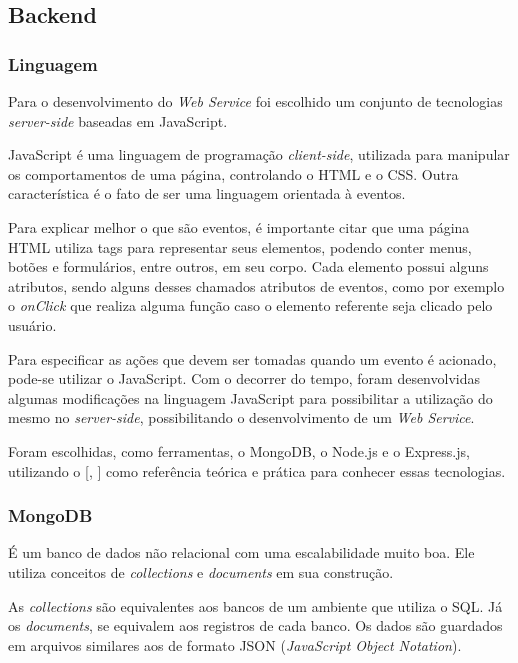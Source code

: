 \documentclass[
	12pt,				%
	oneside,			%
	a4paper,			%
	brazil				%
]{abntex2}
\newcommand{\citecustom}[1]{[\citeauthoronline{#1}, \citeyear{#1}]}
\begin{document}
\subsection{Backend}

\subsubsection{Linguagem}

Para o desenvolvimento do \textit{Web Service} foi escolhido um conjunto de tecnologias \textit{server-side} baseadas em JavaScript.


JavaScript é uma linguagem de programação \textit{client-side}, utilizada para manipular os comportamentos de uma página, controlando o HTML e o CSS. Outra característica é o fato de ser uma linguagem orientada à eventos.

Para explicar melhor o que são eventos, é importante citar que uma página HTML utiliza tags para representar seus elementos, podendo conter menus, botões e formulários, entre outros, em seu corpo. Cada elemento possui alguns atributos, sendo alguns desses chamados atributos de eventos, como por exemplo o \textit{onClick} que realiza alguma função caso o elemento referente seja clicado pelo usuário.

Para especificar as ações que devem ser tomadas quando um evento é acionado, pode-se utilizar o JavaScript. Com o decorrer do tempo, foram desenvolvidas algumas modificações na linguagem JavaScript para possibilitar a utilização do mesmo no \textit{server-side}, possibilitando o desenvolvimento de um \textit{Web Service}. 

Foram escolhidas, como ferramentas, o MongoDB, o Node.js e o Express.js, utilizando o \citecustom{Almeida2016} como referência teórica e prática para conhecer essas tecnologias.

\subsubsection{MongoDB}

É um banco de dados não relacional com uma escalabilidade muito boa. Ele utiliza conceitos de \textit{collections} e \textit{documents} em sua construção. 

As \textit{collections} são equivalentes aos bancos de um ambiente que utiliza o SQL. Já os \textit{documents}, se equivalem aos registros de cada banco. Os dados são guardados em arquivos similares aos de formato JSON (\textit{JavaScript Object Notation}).
\end{document}
